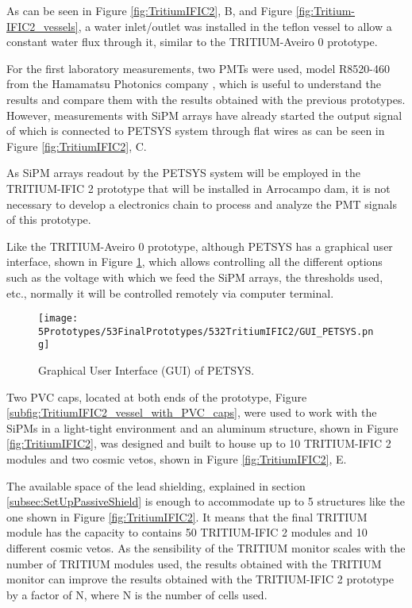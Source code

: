As can be seen in Figure \ref{fig:TritiumIFIC2}, B, and Figure \ref{fig:Tritium-IFIC2_vessels}, a water inlet/outlet was installed in the teflon vessel to allow a constant water flux through it, similar to the TRITIUM-Aveiro 0 prototype.

For the first laboratory measurements, two PMTs were used, model R8520-460 from the Hamamatsu Photonics company \cite{DataSheetPMTs}, which is useful to understand the results and compare them with the results obtained with the previous prototypes. However, measurements with SiPM arrays have already started the output signal of which is connected to PETSYS system through flat wires as can be seen in Figure \ref{fig:TritiumIFIC2}, C.

As SiPM arrays readout by the PETSYS system will be employed in the TRITIUM-IFIC 2 prototype that will be installed in Arrocampo dam, it is not necessary to develop a electronics chain to process and analyze the PMT signals of this prototype.

Like the TRITIUM-Aveiro 0 prototype, although PETSYS has a graphical user interface, shown in Figure \ref{fig:GUI_PETSYS}, which allows controlling all the different options such as the voltage with which we feed the SiPM arrays, the thresholds used, etc., normally it will be controlled remotely via computer terminal. 

\begin{figure}[h]
\centering
\texttt{[image: 5Prototypes/53FinalPrototypes/532TritiumIFIC2/GUI\_PETSYS.png]}
\caption{Graphical User Interface (GUI) of PETSYS.\label{fig:GUI_PETSYS}}
\end{figure}

Two PVC caps, located at both ends of the prototype, Figure \ref{subfig:TritiumIFIC2_vessel_with_PVC_caps}, were used to work with the SiPMs in a light-tight environment and an aluminum structure, shown in Figure \ref{fig:TritiumIFIC2}, was designed and built to house up to 10 TRITIUM-IFIC 2 modules and two cosmic vetos, shown in Figure \ref{fig:TritiumIFIC2}, E.

The available space of the lead shielding, explained in section \ref{subsec:SetUpPassiveShield} is enough to accommodate up to 5 structures like the one shown in Figure \ref{fig:TritiumIFIC2}. It means that the final TRITIUM module has the capacity to contains 50 TRITIUM-IFIC 2 modules and 10 different cosmic vetos. As the sensibility of the TRITIUM monitor scales with the number of TRITIUM modules used, the results obtained with the TRITIUM monitor can improve the results obtained with the TRITIUM-IFIC 2 prototype by a factor of N, where N is the number of cells used.

